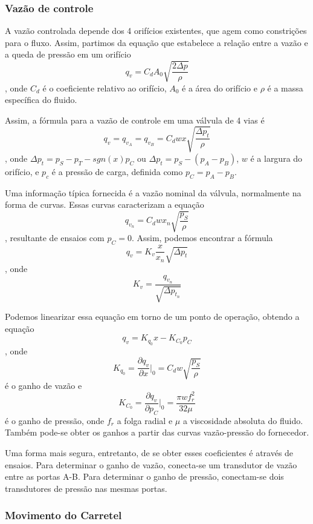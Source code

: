 \documentclass[a4paper]{report}
\begin{document}
\subsubsection*{Vazão de controle}

A vazão controlada depende dos 4 orifícios existentes, que agem como constrições para o fluxo. Assim, partimos da equação que estabelece a relação entre a vazão e a queda de pressão em um orifício \[
q_v = C_d A_0 \sqrt{\frac{2\Delta p}{\rho}} 
\], onde $C_d$ é o coeficiente relativo ao orifício, $A_0$ é a área do orifício e $\rho$ é a massa específica do fluido.

Assim, a fórmula para a vazão de controle em uma válvula de 4 vias é \[
q_v = q_{v_A} = q_{v_B} = C_d w x \sqrt{\frac{\Delta p_t}{\rho}} 
\], onde $\Delta p_t = p_S - p_T - sgn\left( x \right) p_C$ ou $\Delta p_t = p_S - \left( p_A - p_B \right)$, $w$ é a largura do orifício, e $p_c$ é a pressão de carga, definida como $p_C = p_A - p_B$.

Uma informação típica fornecida é a vazão nominal da válvula, normalmente na forma de curvas. Essas curvas caracterizam a equação \[
q_{v_n} = C_d w x_n \sqrt{\frac{p_S}{\rho}} 
\], resultante de ensaios com $p_C = 0$. Assim, podemos encontrar a fórmula \[
q_v = K_v \frac{x}{x_n}\sqrt{\Delta p_t} 
\], onde \[
K_v = \frac{q_{v_n}}{\sqrt{\Delta p_{t_n}} }
\] 

Podemos linearizar essa equação em torno de um ponto de operação, obtendo a equação \[
q_v = K_{q_0}x - K_{C_0}p_C
\], onde \[
K_{q_0} = \frac{\partial q_v}{\partial x} \bigg\rvert_0 = C_d w \sqrt{\frac{p_S}{\rho}} 
\] é o ganho de vazão e \[
K_{C_0} = \frac{\partial q_v}{\partial p_C} \bigg\rvert_0 = \frac{\pi w f_r^2}{32\mu}
\] é o ganho de pressão, onde $f_r$ a folga radial e $\mu$ a viscosidade absoluta do fluido. Também pode-se obter os ganhos a partir das curvas vazão-pressão do fornecedor.

Uma forma mais segura, entretanto, de se obter esses coeficientes é através de ensaios. Para determinar o ganho de vazão, conecta-se um transdutor de vazão entre as portas A-B. Para determinar o ganho de pressão, conectam-se dois transdutores de pressão nas mesmas portas.

\subsubsection*{Movimento do Carretel}
\end{document}

